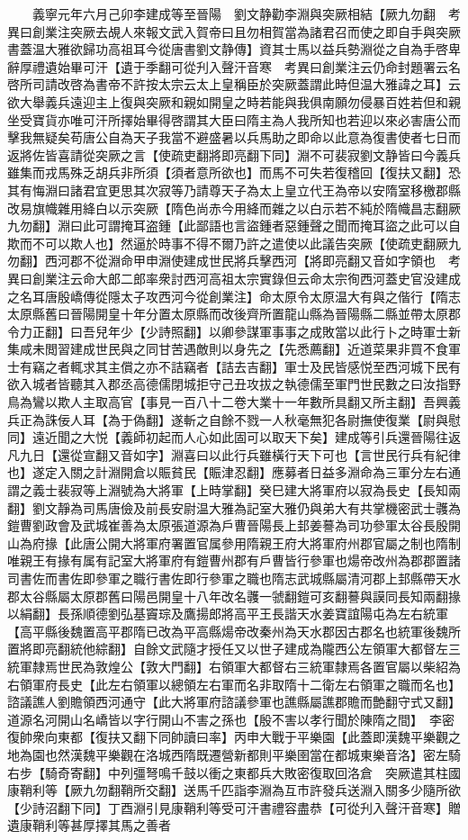 　　義寧元年六月己卯李建成等至晉陽　劉文静勸李淵與突厥相結【厥九勿翻　考異曰創業注突厥去覘人來報文武入賀帝曰且勿相賀當為諸君召而使之即自手與突厥書蓋温大雅欲歸功高祖耳今從唐書劉文静傳】資其士馬以益兵勢淵從之自為手啓卑辭厚禮遺始畢可汗【遺于季翻可從刋入聲汗音寒　考異曰創業注云仍命封題署云名啓所司請改啓為書帝不許按太宗云太上皇稱臣於突厥蓋謂此時但温大雅諱之耳】云欲大舉義兵遠迎主上復與突厥和親如開皇之時若能與我俱南願勿侵暴百姓若但和親坐受寶貨亦唯可汗所擇始畢得啓謂其大臣曰隋主為人我所知也若迎以來必害唐公而擊我無疑矣苟唐公自為天子我當不避盛暑以兵馬助之即命以此意為復書使者七日而返將佐皆喜請從突厥之言【使疏吏翻將即亮翻下同】淵不可裴寂劉文静皆曰今義兵雖集而戎馬殊乏胡兵非所須【須者意所欲也】而馬不可失若復稽回【復扶又翻】恐其有悔淵曰諸君宜更思其次寂等乃請尊天子為太上皇立代王為帝以安隋室移檄郡縣改易旗幟雜用絳白以示突厥【隋色尚赤今用絳而雜之以白示若不純於隋幟昌志翻厥九勿翻】淵曰此可謂掩耳盗鍾【此鄙語也言盜鍾者惡鍾聲之聞而掩耳盜之此可以自欺而不可以欺人也】然逼於時事不得不爾乃許之遣使以此議告突厥【使疏吏翻厥九勿翻】西河郡不從淵命甲申淵使建成世民將兵擊西河【將即亮翻又音如字領也　考異曰創業注云命大郎二郎率衆討西河高祖太宗實錄但云命太宗徇西河蓋史官没建成之名耳唐殷嶠傳從隱太子攻西河今從創業注】命太原令太原温大有與之偕行【隋志太原縣舊曰晉陽開皇十年分置太原縣而改後齊所置龍山縣為晉陽縣二縣並帶太原郡令力正翻】曰吾兒年少【少詩照翻】以卿參謀軍事事之成敗當以此行卜之時軍士新集咸未閲習建成世民與之同甘苦遇敵則以身先之【先悉薦翻】近道菜果非買不食軍士有竊之者輒求其主償之亦不詰竊者【詰去吉翻】軍士及民皆感悦至西河城下民有欲入城者皆聽其入郡丞高德儒閉城拒守己丑攻拔之執德儒至軍門世民數之曰汝指野鳥為鸞以欺人主取高官【事見一百八十二卷大業十一年數所具翻又所主翻】吾興義兵正為誅佞人耳【為于偽翻】遂斬之自餘不戮一人秋毫無犯各尉撫使復業【尉與慰同】遠近聞之大悦【義師初起而人心如此固可以取天下矣】建成等引兵還晉陽往返凡九日【還從宣翻又音如字】淵喜曰以此行兵雖橫行天下可也【言世民行兵有紀律也】遂定入關之計淵開倉以賑貧民【賑津忍翻】應募者日益多淵命為三軍分左右通謂之義士裴寂等上淵號為大將軍【上時掌翻】癸巳建大將軍府以寂為長史【長知兩翻】劉文靜為司馬唐儉及前長安尉温大雅為記室大雅仍與弟大有共掌機密武士彠為鎧曹劉政會及武城崔善為太原張道源為戶曹晉陽長上邽姜謩為司功參軍太谷長殷開山為府掾【此唐公開大將軍府署置官属參用隋親王府大將軍府州郡官屬之制也隋制唯親王有掾有属有記室大將軍府有鎧曹州郡有戶曹皆行參軍也煬帝改州為郡郡置諸司書佐而書佐即參軍之職行書佐即行參軍之職也隋志武城縣屬清河郡上邽縣帶天水郡太谷縣屬太原郡舊曰陽邑開皇十八年改名彠一虢翻鎧可亥翻謩與謨同長知兩翻掾以絹翻】長孫順德劉弘基竇琮及鷹揚郎將高平王長諧天水姜寶誼陽屯為左右統軍【高平縣後魏置高平郡隋已改為平高縣煬帝改秦州為天水郡因古郡名也統軍後魏所置將即亮翻統他綜翻】自餘文武隨才授任又以世子建成為隴西公左領軍大都督左三統軍隸焉世民為敦煌公【敦大門翻】右領軍大都督右三統軍隸焉各置官屬以柴紹為右領軍府長史【此左右領軍以總領左右軍而名非取隋十二衛左右領軍之職而名也】諮議譙人劉贍領西河通守【此大將軍府諮議參軍也譙縣屬譙郡贍而艶翻守式又翻】道源名河開山名嶠皆以字行開山不害之孫也【殷不害以孝行聞於陳隋之間】　李密復帥衆向東都【復扶又翻下同帥讀曰率】丙申大戰于平樂園【此蓋即漢魏平樂觀之地為園也然漢魏平樂觀在洛城西隋既遷營新都則平樂圉當在都城東樂音洛】密左騎右步【騎奇寄翻】中列彊弩鳴千鼓以衝之東都兵大敗密復取回洛倉　突厥遣其柱國康鞘利等【厥九勿翻鞘所交翻】送馬千匹詣李淵為互市許發兵送淵入關多少隨所欲【少詩沼翻下同】丁酉淵引見康鞘利等受可汗書禮容盡恭【可從刋入聲汗音寒】贈遺康鞘利等甚厚擇其馬之善者